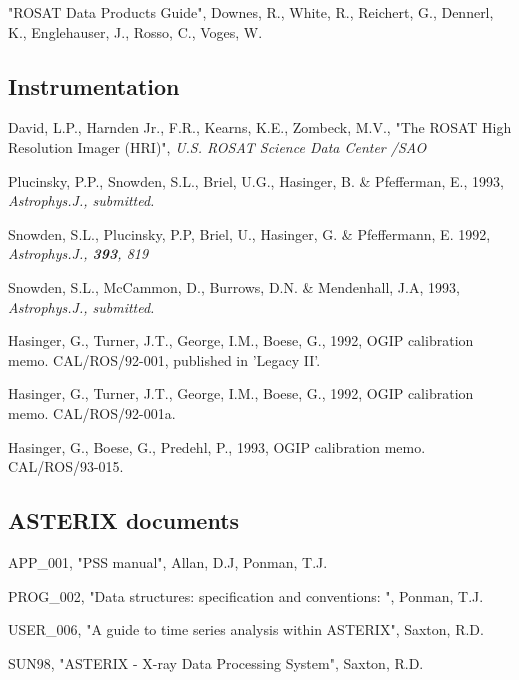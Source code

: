 \documentclass[11pt,fleqn]{article}    %
\begin{document}
"ROSAT Data Products Guide", Downes, R., White, R., Reichert, G., 
Dennerl, K., Englehauser, J., Rosso, C., Voges, W.

\subsection{Instrumentation}

David, L.P., Harnden Jr., F.R., Kearns, K.E., Zombeck, M.V., 
"The ROSAT High Resolution Imager (HRI)", {\em U.S. ROSAT Science Data Center
/SAO}

Plucinsky, P.P., Snowden, S.L., Briel, U.G., Hasinger, B. \& Pfefferman, E.,
1993, {\em Astrophys.J., submitted.}

Snowden, S.L., Plucinsky, P.P, Briel, U., Hasinger, G. \& Pfeffermann, E.
1992, {\em Astrophys.J., {\bf 393}, 819}

Snowden, S.L., McCammon, D., Burrows, D.N. \& Mendenhall, J.A, 1993, 
{\em Astrophys.J., submitted.}

Hasinger, G., Turner, J.T., George, I.M., Boese, G.,
1992, OGIP calibration memo. CAL/ROS/92-001, published in 'Legacy II'.

Hasinger, G., Turner, J.T., George, I.M., Boese, G.,
1992, OGIP calibration memo. CAL/ROS/92-001a.

Hasinger, G., Boese, G., Predehl, P.,
1993, OGIP calibration memo. CAL/ROS/93-015.

\subsection{ASTERIX documents}

APP\_001, "PSS manual", Allan, D.J, Ponman, T.J.

PROG\_002, "Data structures: specification and conventions: ", Ponman, T.J. 

USER\_006, "A guide to time series analysis within ASTERIX", Saxton, R.D. 

SUN98, "ASTERIX - X-ray Data Processing System", Saxton, R.D. 
\end{document}
